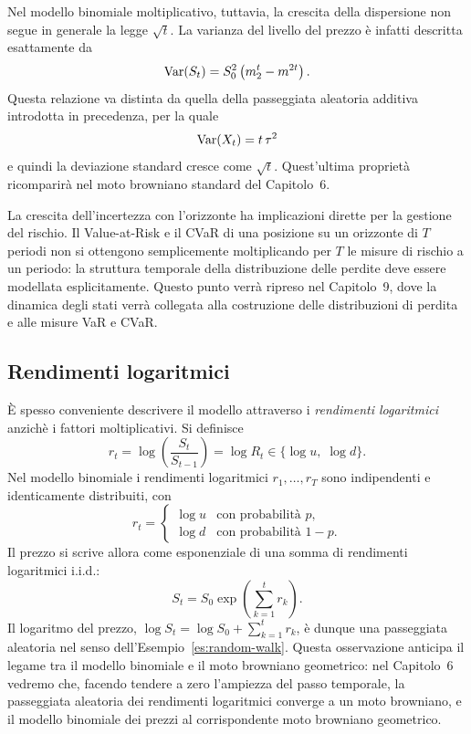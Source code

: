 Nel modello binomiale moltiplicativo, tuttavia, la crescita della
dispersione non segue in generale la legge $\sqrt{t}$. La varianza
del livello del prezzo \`{e} infatti descritta esattamente da
\[
\operatorname{Var}(S_t)
=
S_0^2
\left(
m_2^t-m^{2t}
\right).
\]
Questa relazione va distinta da quella della passeggiata aleatoria
additiva introdotta in precedenza, per la quale
\[
\operatorname{Var}(X_t)=t\,\tau^2
\]
e quindi la deviazione standard cresce come $\sqrt{t}$. Quest'ultima
propriet\`{a} ricomparir\`{a} nel moto browniano standard del
Capitolo~6.

\begin{remark}
La crescita dell'incertezza con l'orizzonte ha implicazioni dirette
per la gestione del rischio. Il Value-at-Risk e il CVaR di una
posizione su un orizzonte di $T$ periodi non si ottengono
semplicemente moltiplicando per $T$ le misure di rischio a un
periodo: la struttura temporale della distribuzione delle perdite
deve essere modellata esplicitamente. Questo punto verr\`{a} ripreso nel Capitolo~9, dove la dinamica
degli stati verr\`{a} collegata alla costruzione delle distribuzioni
di perdita e alle misure VaR e CVaR.
\end{remark}


\subsection{Rendimenti logaritmici}

\noindent
\`{E} spesso conveniente descrivere il modello attraverso i
\emph{rendimenti logaritmici} anzich\`{e} i fattori moltiplicativi.
Si definisce
\[
r_t=\log\!\left(\frac{S_t}{S_{t-1}}\right)=\log R_t
\in\{\log u,\;\log d\}.
\]
Nel modello binomiale i rendimenti logaritmici $r_1,\ldots,r_T$ sono
indipendenti e identicamente distribuiti, con
\[
r_t=\begin{cases}
\log u & \text{con probabilit\`{a} }p,\\
\log d & \text{con probabilit\`{a} }1-p.
\end{cases}
\]
Il prezzo si scrive allora come esponenziale di una somma di
rendimenti logaritmici i.i.d.:
\[
S_t=S_0\exp\!\left(\sum_{k=1}^{t}r_k\right).
\]
Il logaritmo del prezzo, $\log S_t=\log S_0+\sum_{k=1}^{t}r_k$,
\`{e} dunque una passeggiata aleatoria nel senso
dell'Esempio~\ref{es:random-walk}. Questa osservazione anticipa il
legame tra il modello binomiale e il moto browniano geometrico: nel
Capitolo~6 vedremo che, facendo tendere a zero l'ampiezza del passo
temporale, la passeggiata aleatoria dei rendimenti logaritmici
converge a un moto browniano, e il modello binomiale dei prezzi al
corrispondente moto browniano geometrico.

